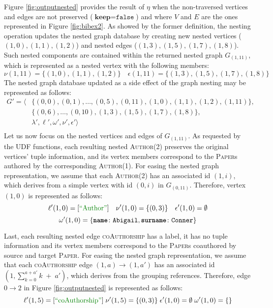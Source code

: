 \begin{ex}[label=exNest]
Figure \ref{fig:outputnested} provides the result of $\eta$ when the non-traversed vertices and edges are not preserved ($\textbf{keep}=\texttt{false}$) and where $V$ and $E$ are the ones represented in Figure \ref{fig:bibex2}. As showed by the former definition, the nesting operation updates the nested graph database by creating new nested vertices ($(1,0),(1,1),(1,2)$) and nested edges ($(1,3),(1,5),(1,7),(1,8)$). Such nested components are contained within the returned nested graph $G_{(1,11)}$, which is represented as a nested vertex with the following members:
\[\nu(1,11)=\{(1,0),(1,1),(1,2)\}\quad \epsilon(1,11)=\{(1,3),(1,5),(1,7),(1,8)\}\]
The nested graph database updated as a side effect of the graph nesting may be represented as follows:
\[\begin{split}
G'=\big\langle &\{(0,0),(0,1),\dots,(0,5),(0,11),(1,0),(1,1),(1,2),(1,11)\},\\
	  & \{(0,6),\dots,(0,10),(1,3),(1,5),(1,7),(1,8)\}, \\
	  & \lambda',\ell',\omega',\nu',\epsilon'\big\rangle\\
\end{split}\]
Let us now focus on the nested vertices and edges of $G_{(1,11)}$. As requested by the UDF functions, each resulting nested \textsc{Author}(2) preserves the original  vertices' tuple information, and its vertex members correspond to the \textsc{Paper}s authored by the corresponding \textsc{Author}(1). For easing the nested graph representation, we assume that each \textsc{Author}(2) has an associated  id $(1,i)$, which derives from a simple vertex with id $(0,i)$ in $G_{(0,11)}$. Therefore, vertex $(1,0)$ is represented as follows:
\[\ell'(1,0)=[\mstr{Author}]\quad\nu'(1,0)=\{(0,3)\}\quad \epsilon'(1,0)=\emptyset\] \[\omega'(1,0)=\{\texttt{\textbf{name}}\colon\texttt{Abigail},\texttt{\textbf{surname}}\colon\texttt{Conner}\}\]

Last, each resulting nested edge \textsc{coAuthorship} has a  label, it has no tuple information and its vertex members correspond to the \textsc{Paper}s coauthored by source and target \textsc{Paper}.
For easing the nested graph representation, we assume that each \textsc{coAuthorship} edge $(1,a)\to (1,a')$ has an associated id $(1,\sum_{k=0}^{a+a'}k\;+\;a')$, which derives from the grouping references. Therefore, edge $0\to 2$ in Figure \ref{fig:outputnested} is represented as follows:
\[\ell'(1,5)=[\mstr{coAuthorship}]\;\nu'(1,5)=\{(0,3)\}\;\epsilon'(1,0)=\emptyset\; \omega'(1,0)=\{\}\] 
\end{ex}


